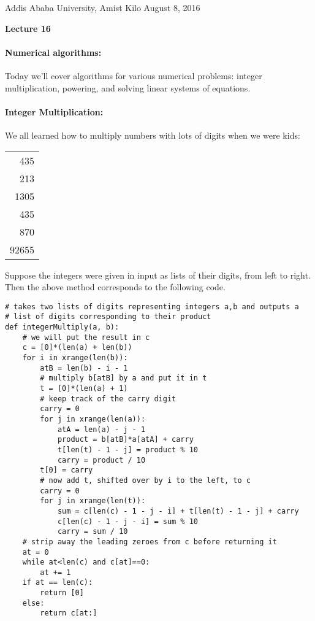 \documentclass[11pt]{article}
\newlength{\toppush}
\newcommand{\htitle}[2]{\noindent\vspace*{-\toppush}\newline\parbox{6.5in}
 {\large Addis Ababa University, Amist Kilo \hfill #1\newline
\hspace*{\fill}{\bf Algorithms and Programming for High Schoolers} \hspace*{\fill} \newline
\mbox{}\hrulefill\mbox{}}\vspace*{1ex}\mbox{}\newline
\begin{center}{\Large\bf #2}\end{center}}
\begin{document}
\htitle{August 8, 2016}{Lecture 16}

\paragraph{\Large Numerical algorithms:}
Today we'll cover algorithms for various numerical problems: 
integer multiplication, powering, and solving linear systems of
equations.

\paragraph{\Large Integer Multiplication:}
We all learned how to multiply numbers with lots of digits when we
were kids:

\begin{center}
{\Large
\begin{tabular}{r}
435\\
213\\
\hline
1305\\
435\hspace*{.2cm}\\
870\hspace*{.4cm}\\
\hline
92655
\end{tabular}
}
\end{center}

Suppose the integers were given in input as lists of their digits,
from left to right.  Then the above method corresponds to the
following code.

\begin{verbatim}
# takes two lists of digits representing integers a,b and outputs a
# list of digits corresponding to their product
def integerMultiply(a, b):
    # we will put the result in c
    c = [0]*(len(a) + len(b))
    for i in xrange(len(b)):
        atB = len(b) - i - 1
        # multiply b[atB] by a and put it in t
        t = [0]*(len(a) + 1)
        # keep track of the carry digit
        carry = 0
        for j in xrange(len(a)):
            atA = len(a) - j - 1
            product = b[atB]*a[atA] + carry
            t[len(t) - 1 - j] = product % 10
            carry = product / 10
        t[0] = carry
        # now add t, shifted over by i to the left, to c
        carry = 0
        for j in xrange(len(t)):
            sum = c[len(c) - 1 - j - i] + t[len(t) - 1 - j] + carry
            c[len(c) - 1 - j - i] = sum % 10
            carry = sum / 10
    # strip away the leading zeroes from c before returning it
    at = 0
    while at<len(c) and c[at]==0:
        at += 1
    if at == len(c):
        return [0]
    else:
        return c[at:]    
\end{verbatim}
\end{document}
